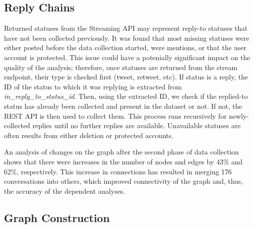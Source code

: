 \documentclass[sigconf]{acmart}
\begin{document}
\subsection{Reply Chains}

Returned statuses from the Streaming API may represent reply-to
statuses that have not been collected previously. It was found that
most missing statuses were either posted before the data collection
started, were mentions, or that the user account is protected. This
issue could have a potenially significant impact on the quality of the
analysis; therefore, once statuses are returned from the stream endpoint, 
their type is checked first (tweet, retweet, etc). If status is a reply, 
the ID of the status to which it was replying is extracted from 
{\emph{in\_reply\_to\_status\_id}}. Then, using the extracted ID, we 
check if the replied-to status has already been collected and present 
in the dataset or not. If not, the REST API is then used to collect 
them. This process runs recursively for newly-collected replies until 
no further replies are available. Unavailable statuses are often 
results from either deletion or protected accounts.

An analysis of changes on the graph after the second phase of data
collection shows that there were increases in the number of nodes and
edges by 43\% and 62\%, respectively. This increase in connections has
resulted in merging 176 conversations into others, which improved
connectivity of the graph and, thus, the accuracy of the dependent
analyses.



\subsection{Graph Construction}
\end{document}
